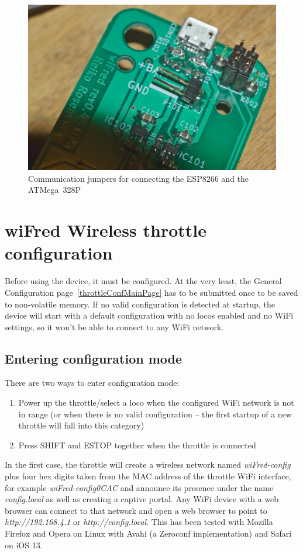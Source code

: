 \documentclass[11pt,a4paper]{scrartcl}
\begin{document}
\begin{figure}[tbhp]
  \centering
  \includegraphics[width=0.8 \textwidth]{images/_DSC0149}
  \caption{Communication jumpers for connecting the ESP8266 and the ATMega~328P}
  \label{serialJumpers}
\end{figure}

\clearpage

\section{wiFred Wireless throttle configuration} \label{config}

Before using the device, it must be configured. At the very least, the General Configuration page~\ref{throttleConfMainPage} has to be submitted once to be saved to non-volatile memory. If no valid configuration is detected at startup, the device will start with a default configuration with no locos enabled and no WiFi settings, so it won't be able to connect to any WiFi network.

\subsection{Entering configuration mode}

There are two ways to enter configuration mode:

\begin{enumerate}
\item Power up the throttle/select a loco when the configured WiFi network is not in range (or when there is no valid configuration -- the first startup of a new throttle will fall into this category)
\item Press SHIFT and ESTOP together when the throttle is connected
\end{enumerate}

In the first case, the throttle will create a wireless network named \textit{wiFred-config} plus four hex digits taken from the MAC address of the throttle WiFi interface, for example \textit{wiFred-config0CAC} and announce its presence under the name \textit{config.local} as well as creating a captive portal. Any WiFi device with a web browser can connect to that network and open a web browser to point to \textit{http://192.168.4.1} or \textit{http://config.local}. This has been tested with Mozilla Firefox and Opera on Linux with Avahi (a Zeroconf implementation) and Safari on iOS 13.
\end{document}
